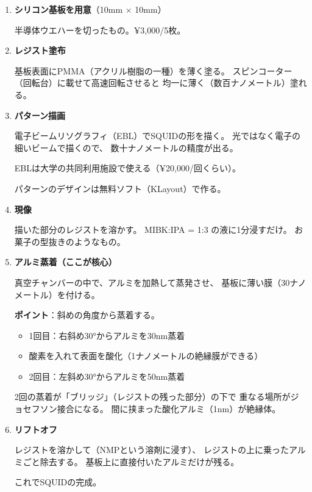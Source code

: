 \documentclass[12pt,a4paper]{article}
\begin{document}
\begin{tukurubox}[SQUIDの作り方（概要）]
\begin{enumerate}
\item \textbf{シリコン基板を用意}（10mm $\times$ 10mm）

半導体ウエハーを切ったもの。¥3,000/5枚。

\item \textbf{レジスト塗布}

基板表面にPMMA（アクリル樹脂の一種）を薄く塗る。
スピンコーター（回転台）に載せて高速回転させると
均一に薄く（数百ナノメートル）塗れる。

\item \textbf{パターン描画}

電子ビームリソグラフィ（EBL）でSQUIDの形を描く。
光ではなく電子の細いビームで描くので、
数十ナノメートルの精度が出る。

EBLは大学の共同利用施設で使える（¥20,000/回くらい）。

パターンのデザインは無料ソフト（KLayout）で作る。

\item \textbf{現像}

描いた部分のレジストを溶かす。
MIBK:IPA = 1:3 の液に1分浸すだけ。
お菓子の型抜きのようなもの。

\item \textbf{アルミ蒸着（ここが核心）}

真空チャンバーの中で、アルミを加熱して蒸発させ、
基板に薄い膜（30ナノメートル）を付ける。

\textbf{ポイント}：斜めの角度から蒸着する。
\begin{itemize}
\item 1回目：右斜め30°からアルミを30nm蒸着
\item 酸素を入れて表面を酸化（1ナノメートルの絶縁膜ができる）
\item 2回目：左斜め30°からアルミを50nm蒸着
\end{itemize}

2回の蒸着が「ブリッジ」（レジストの残った部分）の下で
重なる場所がジョセフソン接合になる。
間に挟まった酸化アルミ（1nm）が絶縁体。

\item \textbf{リフトオフ}

レジストを溶かして（NMPという溶剤に浸す）、
レジストの上に乗ったアルミごと除去する。
基板上に直接付いたアルミだけが残る。

これでSQUIDの完成。
\end{enumerate}
\end{tukurubox}
\end{document}
